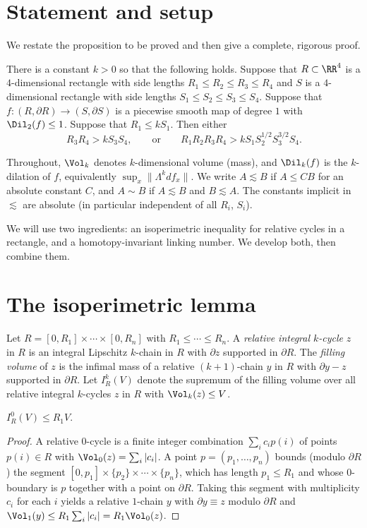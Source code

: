 \section{Statement and setup}

We restate the proposition to be proved and then give a complete, rigorous proof.

\begin{introtheorem}
There is a constant $k>0$ so that the following holds. Suppose that $R\subset\RR^4$ is a $4$-dimensional rectangle with side lengths $R_1\le R_2\le R_3\le R_4$ and $S$ is a $4$-dimensional rectangle with side lengths $S_1\le S_2\le S_3\le S_4$. Suppose that $f:(R,\partial R)\to(S,\partial S)$ is a piecewise smooth map of degree $1$ with $\Dil_2(f)\le 1$. Suppose that $R_1\le kS_1$. Then either
\[
R_3R_4>kS_3S_4,\qquad\text{or}\qquad R_1R_2R_3R_4>kS_1S_2^{1/2}S_3^{3/2}S_4 .
\]
\end{introtheorem}

Throughout, $\Vol_k$ denotes $k$-dimensional volume (mass), and $\Dil_k(f)$ is the $k$-dilation of $f$, equivalently $\sup_{x}\|\Lambda^k df_x\|$. We write $A\lesssim B$ if $A\le CB$ for an absolute constant $C$, and $A\sim B$ if $A\lesssim B$ and $B\lesssim A$. The constants implicit in $\lesssim$ are absolute (in particular independent of all $R_i$, $S_i$).

We will use two ingredients: an isoperimetric inequality for relative cycles in a rectangle, and a homotopy-invariant linking number. We develop both, then combine them.

\section{The isoperimetric lemma}

Let $R=[0,R_1]\times\cdots\times[0,R_n]$ with $R_1\le\cdots\le R_n$. A \emph{relative integral $k$-cycle} $z$ in $R$ is an integral Lipschitz $k$-chain in $R$ with $\partial z$ supported in $\partial R$. The \emph{filling volume} of $z$ is the infimal mass of a relative $(k+1)$-chain $y$ in $R$ with $\partial y - z$ supported in $\partial R$. Let $I_R^k(V)$ denote the supremum of the filling volume over all relative integral $k$-cycles $z$ in $R$ with $\Vol_k(z)\le V$.

\begin{lemma}\label{iso0}
$I_R^0(V)\le R_1V$.
\end{lemma}

\begin{proof}
A relative $0$-cycle is a finite integer combination $\sum_i c_i p(i)$ of points $p(i)\in R$ with $\Vol_0(z)=\sum_i|c_i|$. A point $p=(p_1,\dots,p_n)$ bounds (modulo $\partial R$) the segment $[0,p_1]\times\{p_2\}\times\cdots\times\{p_n\}$, which has length $p_1\le R_1$ and whose $0$-boundary is $p$ together with a point on $\partial R$. Taking this segment with multiplicity $c_i$ for each $i$ yields a relative $1$-chain $y$ with $\partial y \equiv z$ modulo $\partial R$ and $\Vol_1(y)\le R_1\sum_i|c_i| = R_1\Vol_0(z)$.
\end{proof}

